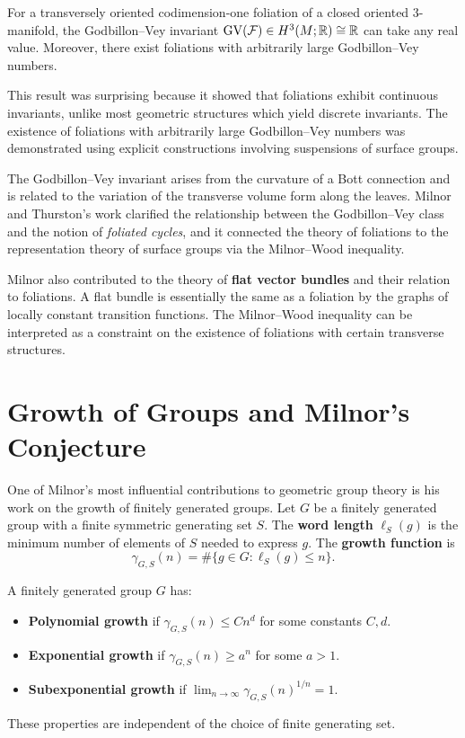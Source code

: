 \begin{theorem}
For a transversely oriented codimension-one foliation of a closed oriented 3-manifold, the Godbillon--Vey invariant \(\operatorname{GV}(\mathcal{F}) \in H^3(M; \mathbb{R}) \cong \mathbb{R}\) can take any real value. Moreover, there exist foliations with arbitrarily large Godbillon--Vey numbers.
\end{theorem}

This result was surprising because it showed that foliations exhibit continuous invariants, unlike most geometric structures which yield discrete invariants. The existence of foliations with arbitrarily large Godbillon--Vey numbers was demonstrated using explicit constructions involving suspensions of surface groups.

The Godbillon--Vey invariant arises from the curvature of a Bott connection and is related to the variation of the transverse volume form along the leaves. Milnor and Thurston's work clarified the relationship between the Godbillon--Vey class and the notion of \textit{foliated cycles}, and it connected the theory of foliations to the representation theory of surface groups via the Milnor--Wood inequality.

Milnor also contributed to the theory of \textbf{flat vector bundles} and their relation to foliations. A flat bundle is essentially the same as a foliation by the graphs of locally constant transition functions. The Milnor--Wood inequality can be interpreted as a constraint on the existence of foliations with certain transverse structures.

\section{Growth of Groups and Milnor's Conjecture}

One of Milnor's most influential contributions to geometric group theory is his work on the growth of finitely generated groups. Let \(G\) be a finitely generated group with a finite symmetric generating set \(S\). The \textbf{word length} \(\ell_S(g)\) is the minimum number of elements of \(S\) needed to express \(g\). The \textbf{growth function} is
\[
\gamma_{G,S}(n) = \#\{g \in G : \ell_S(g) \leq n\}.
\]

\begin{definition}
A finitely generated group \(G\) has:
\begin{itemize}
    \item \textbf{Polynomial growth} if \(\gamma_{G,S}(n) \leq C n^d\) for some constants \(C,d\).
    \item \textbf{Exponential growth} if \(\gamma_{G,S}(n) \geq a^n\) for some \(a > 1\).
    \item \textbf{Subexponential growth} if \(\lim_{n \to \infty} \gamma_{G,S}(n)^{1/n} = 1\).
\end{itemize}
These properties are independent of the choice of finite generating set.
\end{definition}

